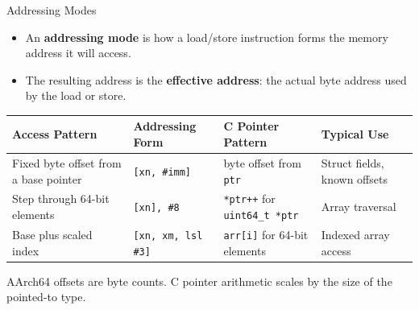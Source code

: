 \documentclass[aspectratio=169,11pt,t]{beamer}
\newcommand{\key}[1]{\textbf{#1}}
\newcommand{\code}[1]{\texttt{#1}}
\begin{document}
\begin{frame}{Addressing Modes}
\large
\begin{itemize}\setlength{\itemsep}{6pt}
  \item An \key{addressing mode} is how a load/store instruction forms the memory address it will access.
  \item The resulting address is the \key{effective address}: the actual byte address used by the load or store.
\end{itemize}

\vspace{0.18cm}
\begin{center}
\scriptsize
\setlength{\tabcolsep}{4pt}
\begin{tabular}{llll}
\toprule
\rowcolor{white}
\textbf{Access Pattern} & \textbf{Addressing Form} & \textbf{C Pointer Pattern} & \textbf{Typical Use} \\
\midrule
Fixed byte offset from a base pointer & \code{[xn, \#imm]} & byte offset from \code{ptr} & Struct fields, known offsets \\
Step through 64-bit elements & \code{[xn], \#8} & \code{*ptr++} for \code{uint64\_t *ptr} & Array traversal \\
Base plus scaled index & \code{[xn, xm, lsl \#3]} & \code{arr[i]} for 64-bit elements & Indexed array access \\
\bottomrule
\end{tabular}
\end{center}

\vspace{0.18cm}
\normalsize
AArch64 offsets are byte counts. C pointer arithmetic scales by the size of the pointed-to type.
\end{frame}


\end{document}
